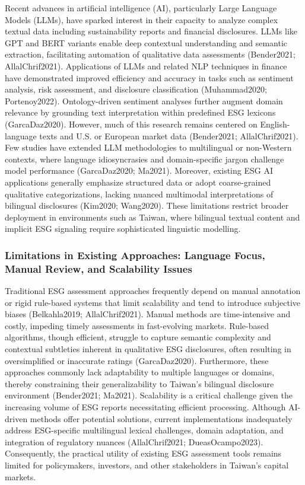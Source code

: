 \documentclass[
  12pt,
]{article}
\begin{document}
Recent advances in artificial intelligence (AI), particularly Large
Language Models (LLMs), have sparked interest in their capacity to
analyze complex textual data including sustainability reports and
financial disclosures. LLMs like GPT and BERT variants enable deep
contextual understanding and semantic extraction, facilitating
automation of qualitative data assessments (Bender2021; AllalChrif2021).
Applications of LLMs and related NLP techniques in finance have
demonstrated improved efficiency and accuracy in tasks such as sentiment
analysis, risk assessment, and disclosure classification (Muhammad2020;
Portenoy2022). Ontology-driven sentiment analyses further augment domain
relevance by grounding text interpretation within predefined ESG
lexicons (GarcaDaz2020). However, much of this research remains centered
on English-language texts and U.S. or European market data (Bender2021;
AllalChrif2021). Few studies have extended LLM methodologies to
multilingual or non-Western contexts, where language idiosyncrasies and
domain-specific jargon challenge model performance (GarcaDaz2020;
Ma2021). Moreover, existing ESG AI applications generally emphasize
structured data or adopt coarse-grained qualitative categorizations,
lacking nuanced multimodal interpretations of bilingual disclosures
(Kim2020; Wang2020). These limitations restrict broader deployment in
environments such as Taiwan, where bilingual textual content and
implicit ESG signaling require sophisticated linguistic modelling.

\subsubsection{Limitations in Existing Approaches: Language Focus,
Manual Review, and Scalability
Issues}\label{limitations-in-existing-approaches-language-focus-manual-review-and-scalability-issues}

Traditional ESG assessment approaches frequently depend on manual
annotation or rigid rule-based systems that limit scalability and tend
to introduce subjective biases (Belkahla2019; AllalChrif2021). Manual
methods are time-intensive and costly, impeding timely assessments in
fast-evolving markets. Rule-based algorithms, though efficient, struggle
to capture semantic complexity and contextual subtleties inherent in
qualitative ESG disclosures, often resulting in oversimplified or
inaccurate ratings (GarcaDaz2020). Furthermore, these approaches
commonly lack adaptability to multiple languages or domains, thereby
constraining their generalizability to Taiwan's bilingual disclosure
environment (Bender2021; Ma2021). Scalability is a critical challenge
given the increasing volume of ESG reports necessitating efficient
processing. Although AI-driven methods offer potential solutions,
current implementations inadequately address ESG-specific multilingual
lexical challenges, domain adaptation, and integration of regulatory
nuances (AllalChrif2021; DueasOcampo2023). Consequently, the practical
utility of existing ESG assessment tools remains limited for
policymakers, investors, and other stakeholders in Taiwan's capital
markets.
\end{document}
